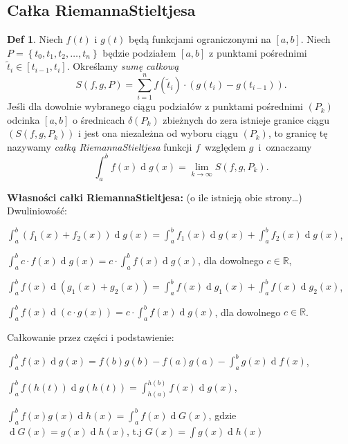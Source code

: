 \documentclass[a4paper, 12pt]{mwart}
\theoremstyle{definition}
\newtheorem{definicja}{Def}[section]
\theoremstyle{plain}
\theoremstyle{remark}
\newenvironment{wide_enum}{
	\vspace{3pt}
	\begin{enumerate}
		\setlength{\itemsep}{5pt}
		\setlength{\parskip}{0pt}
		\setlength{\parsep}{0pt}
}{\end{enumerate}}
\begin{document}
\subsection{Całka Riemanna\dywiz Stieltjesa}
\begin{definicja}
	Niech $f(t)$ i $g(t)$ będą funkcjami ograniczonymi na $[a, b]$. Niech $P = \left\{t_0, t_1, t_2, \ldots, t_n\right\}$ będzie podziałem $[a, b]$ z punktami pośrednimi $\tilde{t}_i\in [t_{i-1}, t_i]$. Określamy \emph{sumę całkową}
	\begin{equation}
		S(f, g, P) = \sum_{i=1}^n f(\tilde{t}_i)\cdot \left(g(t_i) - g(t_{i-1})\right).
	\end{equation}
	Jeśli dla dowolnie wybranego ciągu podziałów z punktami pośrednimi $(P_k)$ odcinka $[a, b]$ o średnicach $\delta(P_k)$ zbieżnych do zera istnieje granice ciągu $(S(f, g, P_k))$ i jest ona niezależna od wyboru ciągu $(P_k)$, to granicę tę nazywamy \emph{całką Riemanna\dywiz Stieltjesa} funkcji $f$~względem $g$~i~oznaczamy
	\begin{equation}
		\int_a^b f(x)\operatorname{d}\!g(x) = \lim_{k\to\infty} S(f, g, P_k).
	\end{equation}
\end{definicja}
\vspace{20px}
{\bf Własności całki Riemanna\dywiz Stieltjesa:} (o ile istnieją obie strony\ldots) \\
Dwuliniowość:
\begin{wide_enum}
	\item $\int_a^b (f_1(x) + f_2(x))\operatorname{d}\!g(x) = \int_a^b f_1(x)\operatorname{d}\!g(x) + \int_a^b f_2(x)\operatorname{d}\!g(x)$,
	\item  $\int_a^b c\cdot f(x)\operatorname{d}\!g(x) = c \cdot\int_a^b f(x)\operatorname{d}\!g(x)$, dla dowolnego $c \in\mathbb{R}$,
	\item $\int_a^b f(x)\operatorname{d}(g_1(x) + g_2(x)) = \int_a^b f(x)\operatorname{d}\!g_1(x) + \int_a^b f(x)\operatorname{d}\!g_2(x)$,
	\item  $\int_a^b f(x)\operatorname{d}(c\cdot g(x)) = c \cdot\int_a^b f(x)\operatorname{d}\!g(x)$, dla dowolnego $c \in\mathbb{R}$.
\end{wide_enum}
Całkowanie przez części i podstawienie:
\begin{wide_enum} %
	\item $\int_a^b f(x)\operatorname{d}\!g(x) = f(b)g(b) - f(a)g(a) - \int_a^b g(x)\operatorname{d}\!f(x)$,
	\item $\int_a^b f(h(t))\operatorname{d}\!g(h(t)) = \int_{h(a)}^{h(b)} f(x)\operatorname{d}\!g(x)$,
	\item $\int_a^b f(x)g(x)\operatorname{d}\!h(x) = \int_a^b f(x)\operatorname{d}\!G(x)$, gdzie $\operatorname{d}\!G(x) = g(x)\operatorname{d}\!h(x)$, t.j $G(x) = \int g(x)\operatorname{d}\!h(x)$
\end{wide_enum}
\end{document}
